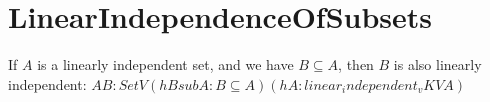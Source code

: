 \section{LinearIndependenceOfSubsets}

\begin{theorem}
  \label{theorem : subset_linear_independent}
  \leanok
  If $A$ is a linearly independent set, and we have $B \subseteq A$, then $B$ is also linearly independent: ${A B : Set V} (hBsubA : B \subseteq A) (hA : linear_independent_v K V A)$
\end{theorem}
